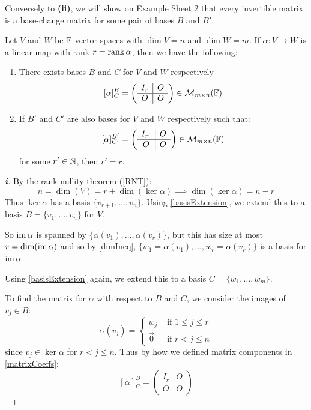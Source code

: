 \documentclass[../main.tex]{subfiles}
\begin{document}
\begin{remark}
  Conversely to \textbf{(ii)}, we will show on Example Sheet 2 that every invertible matrix is a base-change matrix for some pair of bases $B$ and $B'$.
\end{remark}
\begin{theorem}
  Let $V$ and $W$ be $\mathbb{F}$-vector spaces with $\dim V = n$ and $\dim W = m$.
  If $\alpha: V \to W$ is a linear map with rank $r = \operatorname{rank} \alpha$, then we have the following: \label{niceMatrixForm}
  \begin{enumerate}
    \item There exists bases $B$ and $C$ for $V$ and $W$ respectively
      \[
        [\alpha]^{B}_{C} = \left(\begin{array}{c|c}
        I_r & O \\ \hline
        O & O
        \end{array}\right) \in \mathcal{M}_{m \times n}(\mathbb{F})
      \]
    \item If $B'$ and $C'$ are also bases for $V$ and $W$ respectively such that:
      \[
        [\alpha]^{B'}_{C'} = \left(\begin{array}{c|c}
        I_{r'} & O \\ \hline
        O & O
        \end{array}\right) \in \mathcal{M}_{m \times n}(\mathbb{F})
      \]
      for some $r' \in \mathbb{N}$, then $r' = r$.
  \end{enumerate}
\end{theorem}
\begin{proof}[\textbf{i}]
  By the rank nullity theorem (\cref{RNT}):
  \[
    n = \dim(V) = r + \dim(\ker \alpha) \implies \dim(\ker \alpha) = n - r
  \]
  Thus $\ker \alpha$ has a basis $\{v_{r + 1}, \ldots, v_n\}$.
  Using \cref{basisExtension}, we extend this to a basis $B = \{v_1, \ldots, v_n\}$ for $V$.

  So $\operatorname{im} \alpha$ is spanned by $\{\alpha(v_1), \ldots, \alpha(v_r)\}$, but this has size at most $r = \dim(\operatorname{im} \alpha)$ and so by \cref{dimIneq}, $\{w_1 = \alpha(v_1), \ldots, w_r = \alpha(v_r)\}$ is a basis for $\operatorname{im} \alpha$.

  Using \cref{basisExtension} again, we extend this to a basis $C = \{w_1, \ldots, w_m\}$.

  To find the matrix for $\alpha$ with respect to $B$ and $C$, we consider the images of $v_j \in B$:
  \[
    \alpha(v_j) = \begin{cases}
    w_j & \text{ if } 1 \leq j \leq r \\
    \vec{0} & \text{ if } r < j \leq n
    \end{cases}
  \]
  since $v_j \in \ker \alpha$ for $r < j \leq n$.
  Thus by how we defined matrix components in \cref{matrixCoeffs}:
  \[
    [\alpha]^{B}_{C} = \left(\begin{array}{c|c}
    I_r & O \\ \hline
    O & O
    \end{array}\right)
  \]
\end{proof}
\end{document}
